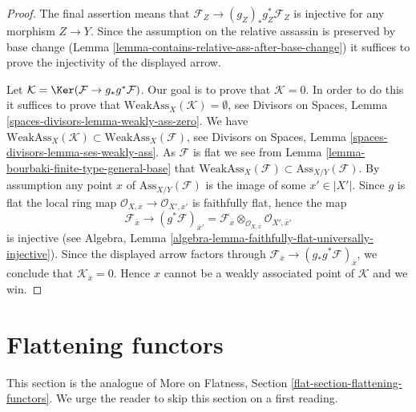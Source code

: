 \begin{proof}
The final assertion means that $\mathcal{F}_Z \to (g_Z)_*g_Z^*\mathcal{F}_Z$
is injective for any morphism $Z \to Y$. Since the assumption on
the relative assassin is preserved by base change
(Lemma \ref{lemma-contains-relative-ass-after-base-change})
it suffices to prove the injectivity of the displayed arrow.

\medskip\noindent
Let $\mathcal{K} = \Ker(\mathcal{F} \to g_*g^*\mathcal{F})$.
Our goal is to prove that $\mathcal{K} = 0$.
In order to do this it suffices to prove that
$\text{WeakAss}_X(\mathcal{K}) = \emptyset$, see
Divisors on Spaces, Lemma \ref{spaces-divisors-lemma-weakly-ass-zero}.
We have
$\text{WeakAss}_X(\mathcal{K}) \subset \text{WeakAss}_X(\mathcal{F})$, see
Divisors on Spaces, Lemma \ref{spaces-divisors-lemma-ses-weakly-ass}.
As $\mathcal{F}$ is flat we see from
Lemma \ref{lemma-bourbaki-finite-type-general-base}
that $\text{WeakAss}_X(\mathcal{F}) \subset \text{Ass}_{X/Y}(\mathcal{F})$.
By assumption any point $x$ of $\text{Ass}_{X/Y}(\mathcal{F})$
is the image of some $x' \in |X'|$. Since $g$ is flat the
local ring map
$\mathcal{O}_{X, \overline{x}} \to \mathcal{O}_{X', \overline{x}'}$
is faithfully flat, hence the map
$$
\mathcal{F}_{\overline{x}}
\longrightarrow
(g^*\mathcal{F})_{\overline{x}'} =
\mathcal{F}_{\overline{x}} \otimes_{\mathcal{O}_{X, \overline{x}}}
\mathcal{O}_{X', \overline{x}'}
$$
is injective (see
Algebra, Lemma \ref{algebra-lemma-faithfully-flat-universally-injective}).
Since the displayed arrow factors through
$\mathcal{F}_{\overline{x}} \to (g_*g^*\mathcal{F})_{\overline{x}}$,
we conclude that
$\mathcal{K}_{\overline{x}} = 0$. Hence $x$ cannot be a weakly associated
point of $\mathcal{K}$ and we win.
\end{proof}









\section{Flattening functors}
\label{section-F-zero}

\noindent
This section is the analogue of
More on Flatness, Section \ref{flat-section-flattening-functors}.
We urge the reader to skip this section on a first reading.

